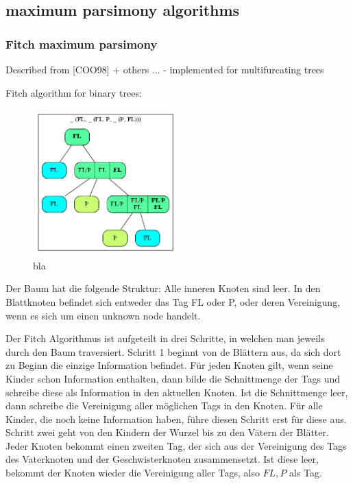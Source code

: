     \subsection{maximum parsimony algorithms}
      \subsubsection{Fitch maximum parsimony}
        Described from [COO98] + others ... - implemented for multifurcating trees

        Fitch algorithm for binary trees:
        \begin{figure}
          \caption{bla}
          \centering
            \includegraphics[width=0.5\textwidth]{Figures/Fitch1.png}
        \end{figure}

        Der Baum hat die folgende Struktur: Alle inneren Knoten sind leer. In den Blattknoten befindet 
        sich entweder das Tag FL oder P, oder deren Vereinigung, wenn es sich um einen unknown node handelt.

        Der Fitch Algorithmus ist aufgeteilt in drei Schritte, in welchen man jeweils durch den Baum traversiert.
        Schritt 1 beginnt von de Blättern aus, da sich dort zu Beginn die einzige Information befindet. 
        Für jeden Knoten gilt, wenn seine Kinder schon Information enthalten, dann bilde die Schnittmenge 
        der Tags und schreibe diese als Information in den aktuellen Knoten. Ist die Schnittmenge leer, 
        dann schreibe die Vereinigung aller möglichen Tags in den Knoten. Für alle Kinder, die noch keine 
        Information haben, führe diesen Schritt erst für diese aus.
        Schritt zwei geht von den Kindern der Wurzel bis zu den Vätern der Blätter. Jeder Knoten bekommt 
        einen zweiten Tag, der sich aus der Vereinigung des Tags des Vaterknoten und der Geschwisterknoten
        zusammensetzt. Ist diese leer, bekommt der Knoten wieder die Vereinigung aller Tags, also ${FL,P}$ als Tag.

